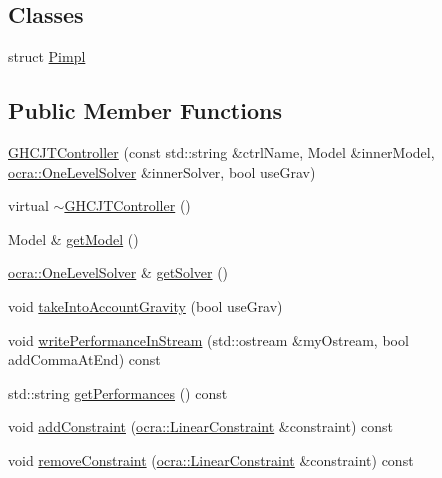 \subsection*{Classes}
\begin{DoxyCompactItemize}
\item 
struct \hyperlink{structgocra_1_1GHCJTController_1_1Pimpl}{Pimpl}
\end{DoxyCompactItemize}
\subsection*{Public Member Functions}
\begin{DoxyCompactItemize}
\item 
\hyperlink{classgocra_1_1GHCJTController_a0a9898a818ddf6e52da7d63616bd73f6}{G\+H\+C\+J\+T\+Controller} (const std\+::string \&ctrl\+Name, Model \&inner\+Model, \hyperlink{classocra_1_1OneLevelSolver}{ocra\+::\+One\+Level\+Solver} \&inner\+Solver, bool use\+Grav)
\item 
virtual \hyperlink{classgocra_1_1GHCJTController_ab20678c55e42d6f844b11e044f258e4b}{$\sim$\+G\+H\+C\+J\+T\+Controller} ()
\item 
Model \& \hyperlink{classgocra_1_1GHCJTController_ac687ebab107bcd79828564b0adad2e10}{get\+Model} ()
\item 
\hyperlink{classocra_1_1OneLevelSolver}{ocra\+::\+One\+Level\+Solver} \& \hyperlink{classgocra_1_1GHCJTController_a25b8ce2edaa3fccc38dfa81900353856}{get\+Solver} ()
\item 
void \hyperlink{classgocra_1_1GHCJTController_a755394cc7a6c038f517583faa47e7f62}{take\+Into\+Account\+Gravity} (bool use\+Grav)
\item 
void \hyperlink{classgocra_1_1GHCJTController_a71c44a633f39e843d97fc7f97dddfce4}{write\+Performance\+In\+Stream} (std\+::ostream \&my\+Ostream, bool add\+Comma\+At\+End) const
\item 
std\+::string \hyperlink{classgocra_1_1GHCJTController_add50119553cb0f5de3f5639523968939}{get\+Performances} () const
\item 
void \hyperlink{classgocra_1_1GHCJTController_a04da6a1642a2f6e79c2a6cf375ff703c}{add\+Constraint} (\hyperlink{namespaceocra_ae8b87cf4099be3efc3b410019ad2046e}{ocra\+::\+Linear\+Constraint} \&constraint) const
\item 
void \hyperlink{classgocra_1_1GHCJTController_a1ca094d27af8fe35e4196647eb5aeb4e}{remove\+Constraint} (\hyperlink{namespaceocra_ae8b87cf4099be3efc3b410019ad2046e}{ocra\+::\+Linear\+Constraint} \&constraint) const

\end{DoxyCompactItemize}
